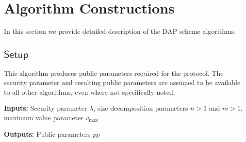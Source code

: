 \documentclass{llncs}
\newcommand{\func}[1]{\mathsf{#1}}
\begin{document}
\section{Algorithm Constructions}

In this section we provide detailed description of the DAP scheme algorithms.


\subsection{\texorpdfstring{$\func{Setup}$}{Setup}}

This algorithm produces public parameters required for the protocol.
The security parameter and resulting public parameters are assumed to be available to all other algorithms, even where not specifically noted.

\textbf{Inputs:} Security parameter $\lambda$, size decomposition parameters $n > 1$ and $m > 1$, maximum value parameter $v_{\text{max}}$

\textbf{Outputs:} Public parameters $pp$
\end{document}
